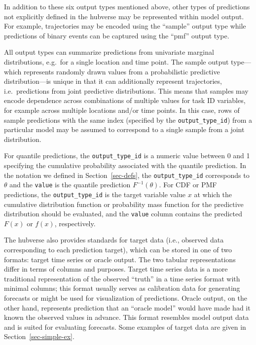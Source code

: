 \documentclass[
]{article}
\begin{document}
In addition to these six output types mentioned above, other types of
predictions not explicitly defined in the hubverse may be represented
within model output. For example, trajectories may be encoded using the
``sample'' output type while predictions of binary events can be
captured using the ``pmf'' output type.

All output types can summarize predictions from univariate marginal
distributions, e.g.~for a single location and time point. The sample
output type---which represents randomly drawn values from a
probabilistic predictive distribution---is unique in that it can
additionally represent trajectories, i.e.~predictions from joint
predictive distributions. This means that samples may encode dependence
across combinations of multiple values for task ID variables, for
example across multiple locations and/or time points. In this case, rows
of sample predictions with the same index (specified by the
\texttt{output\_type\_id}) from a particular model may be assumed to
correspond to a single sample from a joint distribution.

For quantile predictions, the \texttt{output\_type\_id} is a numeric
value between 0 and 1 specifying the cumulative probability associated
with the quantile prediction. In the notation we defined in
Section~\ref{sec-defs}, the \texttt{output\_type\_id} corresponds to
\(\theta\) and the \texttt{value} is the quantile prediction
\(F^{-1}(\theta)\). For CDF or PMF predictions, the
\texttt{output\_type\_id} is the target variable value \(x\) at which
the cumulative distribution function or probability mass function for
the predictive distribution should be evaluated, and the \texttt{value}
column contains the predicted \(F(x)\) or \(f(x)\), respectively.

The hubverse also provides standards for target data (i.e., observed
data corresponding to each prediction target), which can be stored in
one of two formats: target time series or oracle output. The two tabular
representations differ in terms of columns and purposes. Target time
series data is a more traditional representation of the observed
``truth'' in a time series format with minimal columns; this format
usually serves as calibration data for generating forecasts or might be
used for visualization of predictions. Oracle output, on the other hand,
represents prediction that an ``oracle model'' would have made had it
known the observed values in advance. This format resembles model output
data and is suited for evaluating forecasts. Some examples of target
data are given in Section~\ref{sec-simple-ex}.
\end{document}
